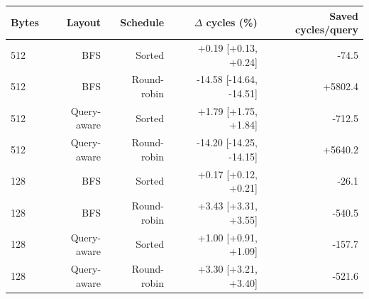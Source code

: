 \begin{tabular}{lrrrr}
\toprule
Bytes & Layout & Schedule & $\Delta$ cycles (\%) & Saved cycles/query \\
\midrule
512 & BFS & Sorted & +0.19 [+0.13, +0.24] & -74.5 \\
512 & BFS & Round-robin & -14.58 [-14.64, -14.51] & +5802.4 \\
512 & Query-aware & Sorted & +1.79 [+1.75, +1.84] & -712.5 \\
512 & Query-aware & Round-robin & -14.20 [-14.25, -14.15] & +5640.2 \\
128 & BFS & Sorted & +0.17 [+0.12, +0.21] & -26.1 \\
128 & BFS & Round-robin & +3.43 [+3.31, +3.55] & -540.5 \\
128 & Query-aware & Sorted & +1.00 [+0.91, +1.09] & -157.7 \\
128 & Query-aware & Round-robin & +3.30 [+3.21, +3.40] & -521.6 \\
\bottomrule
\end{tabular}
